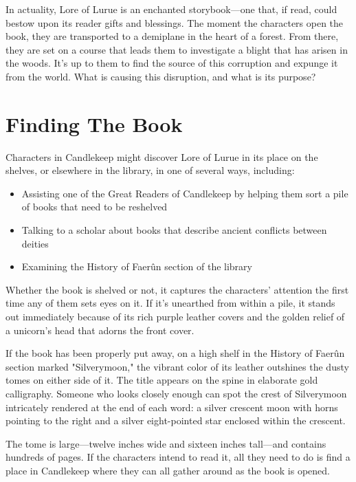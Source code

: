 \documentclass[10pt,a4paper,twoside,bg=print,twocolumn,openany,nodeprecatedcode]{dndbook}
\begin{document}
In actuality, Lore of Lurue is an enchanted storybook—one that, if read, could bestow upon its reader gifts and blessings. The moment the characters open the book, they are transported to a demiplane in the heart of a forest. From there, they are set on a course that leads them to investigate a blight that has arisen in the woods. It's up to them to find the source of this corruption and expunge it from the world. What is causing this disruption, and what is its purpose?

\section{Finding The Book}
Characters in Candlekeep might discover Lore of Lurue in its place on the shelves, or elsewhere in the library, in one of several ways, including:


\begin{itemize}
\item Assisting one of the Great Readers of Candlekeep by helping them sort a pile of books that need to be reshelved
\item Talking to a scholar about books that describe ancient conflicts between deities
\item Examining the History of Faerûn section of the library
\end{itemize}

Whether the book is shelved or not, it captures the characters' attention the first time any of them sets eyes on it. If it's unearthed from within a pile, it stands out immediately because of its rich purple leather covers and the golden relief of a unicorn's head that adorns the front cover.

If the book has been properly put away, on a high shelf in the History of Faerûn section marked "Silverymoon," the vibrant color of its leather outshines the dusty tomes on either side of it. The title appears on the spine in elaborate gold calligraphy. Someone who looks closely enough can spot the crest of Silverymoon intricately rendered at the end of each word: a silver crescent moon with horns pointing to the right and a silver eight-pointed star enclosed within the crescent.

The tome is large—twelve inches wide and sixteen inches tall—and contains hundreds of pages. If the characters intend to read it, all they need to do is find a place in Candlekeep where they can all gather around as the book is opened.
\end{document}
